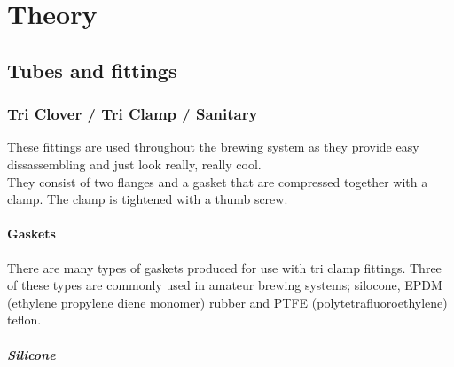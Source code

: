 \documentclass[11pt,fleqn,openany]{book} %
\begin{document}
\tableofcontents %

\cleardoublepage %

\pagestyle{fancy} %


\part{Theory}



\chapter{Tubes and fittings}

\section{Tri Clover / Tri Clamp / Sanitary}

These fittings are used throughout the brewing system as they provide easy dissassembling and just look really, really cool.\\

They consist of two flanges and a gasket that are compressed together with a clamp. The clamp is tightened with a thumb screw.

\subsection{Gaskets}

There are many types of gaskets produced for use with tri clamp fittings. Three of these types are commonly used in amateur brewing systems; silocone, EPDM (ethylene propylene diene monomer) rubber and PTFE (polytetrafluoroethylene) teflon.

\subsubsection{Silicone}
\end{document}
